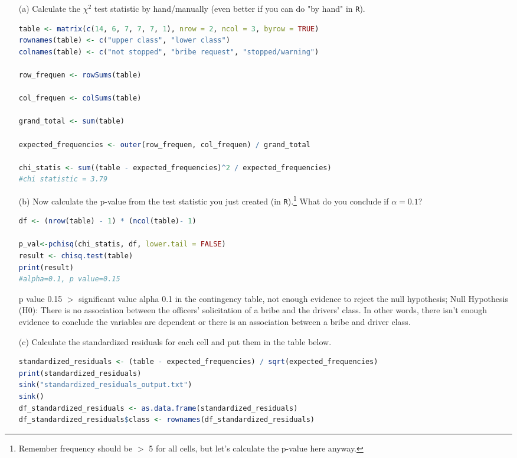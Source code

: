 \documentclass[12pt,letterpaper]{article}
\begin{document}
\begin{enumerate}
	
	\item [(a)]
	Calculate the $\chi^2$ test statistic by hand/manually (even better if you can do "by hand" in \texttt{R}).\\

	\begin{lstlisting}[language=R] 
table <- matrix(c(14, 6, 7, 7, 7, 1), nrow = 2, ncol = 3, byrow = TRUE)
rownames(table) <- c("upper class", "lower class")
colnames(table) <- c("not stopped", "bribe request", "stopped/warning")

row_frequen <- rowSums(table)

col_frequen <- colSums(table)

grand_total <- sum(table)

expected_frequencies <- outer(row_frequen, col_frequen) / grand_total

chi_statis <- sum((table - expected_frequencies)^2 / expected_frequencies)
#chi statistic = 3.79
\end{lstlisting} 

 
	\item [(b)]
	Now calculate the p-value from the test statistic you just created (in \texttt{R}).\footnote{Remember frequency should be $>$ 5 for all cells, but let's calculate the p-value here anyway.}  What do you conclude if $\alpha = 0.1$?\\
\begin{lstlisting}[language=R] 
df <- (nrow(table) - 1) * (ncol(table)- 1)

p_val<-pchisq(chi_statis, df, lower.tail = FALSE)
result <- chisq.test(table)
print(result)
#alpha=0.1, p value=0.15
 \end{lstlisting} 
p value 0.15 $>$ significant value alpha 0.1 in the contingency table, not enough evidence to reject the null hypothesis;
Null Hypothesis (H0): There is no association between the officers' solicitation of a bribe and the drivers' class. In other words, there isn't enough evidence to conclude the variables are dependent or there is an association between a bribe and driver class.

	\newpage
	\item [(c)] Calculate the standardized residuals for each cell and put them in the table below.
	\vspace{1cm}
 \begin{lstlisting}[language=R] 
	standardized_residuals <- (table - expected_frequencies) / sqrt(expected_frequencies)
print(standardized_residuals)
sink("standardized_residuals_output.txt")
sink()
df_standardized_residuals <- as.data.frame(standardized_residuals)
df_standardized_residuals$class <- rownames(df_standardized_residuals)


\end{lstlisting}
\end{enumerate}
\end{document}
